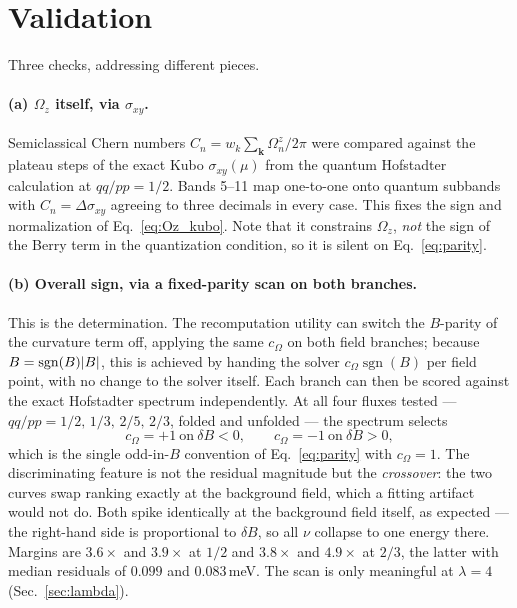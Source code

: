 \documentclass[11pt]{article}
\newcommand{\kb}{\mathbf{k}}
\newcommand{\Om}{\Omega}
\newcommand{\Bfield}{B}
\newcommand{\sgn}{\operatorname{sgn}}
\begin{document}
\section{Validation}\label{sec:validation}

Three checks, addressing different pieces.

\paragraph{(a) $\Om_z$ itself, via $\sigma_{xy}$.}
Semiclassical Chern numbers $C_n = w_k\sum_\kb \Om_n^z/2\pi$ were
compared against the plateau steps of the exact Kubo $\sigma_{xy}(\mu)$
from the quantum Hofstadter calculation at $qq/pp = 1/2$.  Bands 5--11
map one-to-one onto quantum subbands with $C_n = \Delta\sigma_{xy}$
agreeing to three decimals in every case.  This fixes the sign and
normalization of Eq.~\eqref{eq:Oz_kubo}.  Note that it constrains
$\Om_z$, \emph{not} the sign of the Berry term in the quantization
condition, so it is silent on Eq.~\eqref{eq:parity}.

\paragraph{(b) Overall sign, via a fixed-parity scan on both branches.}
This is the determination.  The recomputation utility can switch the
$\Bfield$-parity of the curvature term off, applying the same $c_\Om$ on
both field branches; because $\Bfield = \sgn(\Bfield)\abs{\Bfield}$, this
is achieved by handing the solver $c_\Om \sgn(\Bfield)$ per field point,
with no change to the solver itself.  Each branch can then be scored
against the exact Hofstadter spectrum independently.  At all four fluxes
tested --- $qq/pp = 1/2,\,1/3,\,2/5,\,2/3$, folded and unfolded --- the
spectrum selects
\begin{equation*}
  c_\Om = +1 \ \text{on}\ \delta\Bfield < 0,
  \qquad
  c_\Om = -1 \ \text{on}\ \delta\Bfield > 0,
\end{equation*}
which is the single odd-in-$\Bfield$ convention of
Eq.~\eqref{eq:parity} with $c_\Om = 1$.  The discriminating feature is
not the residual magnitude but the \emph{crossover}: the two curves swap
ranking exactly at the background field, which a fitting artifact would
not do.  Both spike identically at the background field itself, as
expected --- the right-hand side is proportional to $\delta\Bfield$, so
all $\nu$ collapse to one energy there.  Margins are $3.6\times$ and
$3.9\times$ at $1/2$ and $3.8\times$ and $4.9\times$ at $2/3$, the latter
with median residuals of $0.099$ and $0.083$\,meV.  The scan is only
meaningful at $\lambda = 4$ (Sec.~\ref{sec:lambda}).
\end{document}
